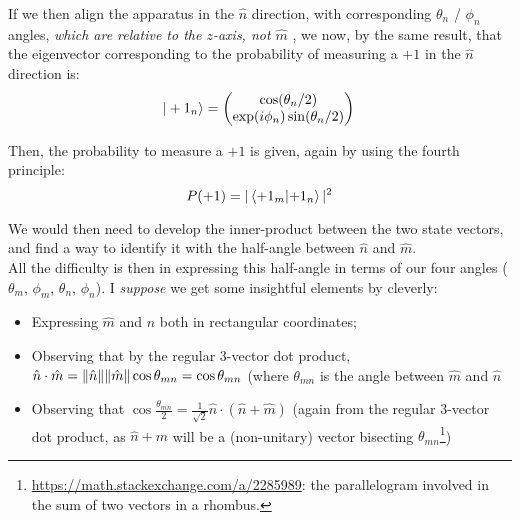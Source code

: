 \documentclass[solutions.tex]{subfiles}
\begin{document}
If we then align the apparatus in the $\hat{n}$ direction, with corresponding
$\theta_n$ / $\phi_n$ angles, \textit{which are relative to the $z$-axis, not
$\hat{m}$} , we now, by the same result, that the eigenvector corresponding
to the probability of measuring a $+1$ in the $\hat{n}$ direction is:
\[
	|+1_n\rangle = \begin{pmatrix}
		\cos(\theta_n/2) \\
		\exp(i\phi_n)\sin(\theta_n/2) \\
	\end{pmatrix} \\
\]

Then, the probability to measure a $+1$ is given, again by using the
fourth principle:
\[
	P(+1) = |\left\langle +1_m \middle| +1_n \right\rangle|^2
\]

We would then need to develop the inner-product between the two state
vectors, and find a way to identify it with the half-angle between
$\hat{n}$ and $\hat{m}$. \\

All the difficulty is then in expressing this half-angle in terms of
our four angles ($\theta_m$, $\phi_m$, $\theta_n$, $\phi_n$). I
\textit{suppose} we get some insightful elements by cleverly:

\begin{itemize}
	\item Expressing $\hat{m}$ and $\hat{n}$ both in rectangular
	coordinates;
	\item Observing that by the regular $3$-vector dot product,
	$\hat{n}\cdot\hat{m} = \lVert \hat{n} \rVert\lVert \hat{m} \rVert\cos\theta_{mn} =
	\cos\theta_{mn}$
	(where $\theta_{mn}$ is the angle between $\hat{m}$ and $\hat{n}$
	\item Observing that $\cos\frac{\theta_{mn}}{2} = \frac1{\sqrt2}\hat{n}\cdot(\hat{n}+\hat{m})$
	(again from the regular $3$-vector dot product, as $\hat{n}+\hat{m}$ will
	be a (non-unitary) vector bisecting $\theta_{mn}$\footnote{
	\url{https://math.stackexchange.com/a/2285989}: the parallelogram involved
	in the sum of two vectors in a rhombus.})
\end{itemize}
\end{document}
